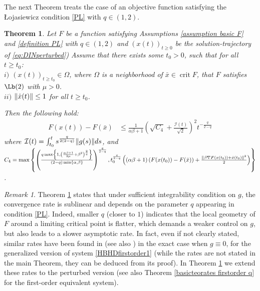 \documentclass[reqno]{amsart}
\theoremstyle{plain}
\newtheorem{theorem}{Theorem}	%
\theoremstyle{definition}
\theoremstyle{remark}
\newtheorem{remark}{Remark}	%
\DeclareMathOperator{\crit}{crit}	%
\DeclarePairedDelimiter{\norm}{\lVert}{\rVert}	%
\newcommand{\Ib}{\mathcal{I}}
\begin{document}
The next Theorem treats the case of an objective function satisfying the \L ojasiewicz condition \ref{PL} with $q\in(1,2)$.
\begin{theorem}\label{basicteo2inexact q}
Let $F$ be a function satisfying Assumptions \ref{assumption basic F} and \ref{definition PL} with $q\in(1,2)$ and $\left(x(t)\right)_{t\geq 0}$ be the solution-trajectory of \eqref{eq:DINperturbed}) Assume that there exists some $t_{0}>0$, such that for all $t\geq t_{0}$:\\
$i)$  $\left(x(t)\right)_{t\geq t_{0}} \in \Omega$, where $\Omega$ is a neighborhood of $\bar{x}\in \crit{F}$, that $F$ satisfies $\Lb(2)$ with $\mu>0$.\\
$ii)$ $\norm{\dot{x}(t)} \leq 1$ for all $t\geq t_{0}$.
	
Then the following hold:
\begin{equation}\label{estimate gap perturbed q}
	\begin{aligned}
		F(x(t))-  F(\bar{x})
		& \leq \frac{1}{\alpha\beta+1}\left(\sqrt{C_{4}} +\frac{\Ib(t)}{\sqrt{2}}\right)^{2}t^{-\frac{q}{2-q}}
	\end{aligned}
\end{equation}
	where 	$\Ib(t) = \int_{t_{0}}^{t}s^{\frac{q}{2(2-q)}}\norm{g(s)}ds$, 
	and\\
	$C_{4} = \max\left\{\left(\frac{q\max\left\{1,\left(\frac{\alpha\beta+1}{2\mu }+\beta^{2}\right)^{\frac{2}{q}}\right\}}{(2-q)\min\{\alpha,\beta\}}\right)^{\frac{q}{2-q}},t_{0}^{\frac{q}{2-q}}\left((\alpha\beta+1)\left(F(x(t_{0}))-F(\bar{x})\right) +\frac{\norm{\beta\nabla F(x(t_{0}))+\dot{x}(t_{0})}^{2}}{2}\right)\right\}$.
\end{theorem}	


\begin{remark}
Theorem \ref{basicteo2inexact q} states that under sufficient integrability condition on $g$, the convergence rate  is sublinear and depends on the parameter $q$ appearing in condition \ref{PL}. Indeed, smaller $q$ (closer to $1$) indicates that the local geometry of $F$ around a limiting critical point is flatter, which demands a weaker control on $g$, but also leads to a slower asymptotic rate. In fact, even if not clearly stated, similar rates have been found in \cite[Theorem $13$]{castera2021inertial} (see also \cite{maulen2024inertial}) in the exact case when $g\equiv 0$, for the generalized version of system \ref{HBHDfirstorder1} (while the rates are not stated in the main Theorem, they can be deduced from its proof). In Theorem \ref{basicteo2inexact q} we extend these rates to the perturbed version (see also Theorem \ref{basicteorates firstorder q} for the first-order equivalent system).
\end{remark}
\end{document}
